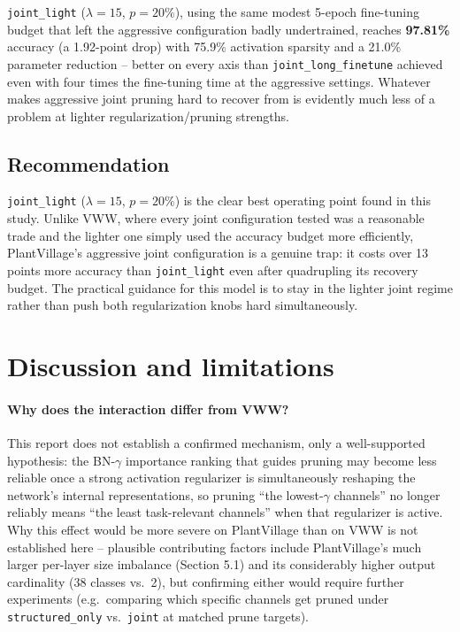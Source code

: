 \documentclass[11pt]{article}
\newcommand{\code}[1]{\texttt{#1}}
\begin{document}
\code{joint\_light} ($\lambda=15$, $p=20\%$), using the same modest 5-epoch fine-tuning budget that left the aggressive configuration badly undertrained, reaches \textbf{97.81\%} accuracy (a 1.92-point drop) with 75.9\% activation sparsity and a 21.0\% parameter reduction -- better on every axis than \code{joint\_long\_finetune} achieved even with four times the fine-tuning time at the aggressive settings. Whatever makes aggressive joint pruning hard to recover from is evidently much less of a problem at lighter regularization/pruning strengths.

\subsection{Recommendation}

\code{joint\_light} ($\lambda=15$, $p=20\%$) is the clear best operating point found in this study. Unlike VWW, where every joint configuration tested was a reasonable trade and the lighter one simply used the accuracy budget more efficiently, PlantVillage's aggressive joint configuration is a genuine trap: it costs over 13 points more accuracy than \code{joint\_light} even after quadrupling its recovery budget. The practical guidance for this model is to stay in the lighter joint regime rather than push both regularization knobs hard simultaneously.

\section{Discussion and limitations}

\paragraph{Why does the interaction differ from VWW?} This report does not establish a confirmed mechanism, only a well-supported hypothesis: the BN-$\gamma$ importance ranking that guides pruning may become less reliable once a strong activation regularizer is simultaneously reshaping the network's internal representations, so pruning ``the lowest-$\gamma$ channels'' no longer reliably means ``the least task-relevant channels'' when that regularizer is active. Why this effect would be more severe on PlantVillage than on VWW is not established here -- plausible contributing factors include PlantVillage's much larger per-layer size imbalance (Section 5.1) and its considerably higher output cardinality (38 classes vs.\ 2), but confirming either would require further experiments (e.g.\ comparing which specific channels get pruned under \code{structured\_only} vs.\ \code{joint} at matched prune targets).
\end{document}

